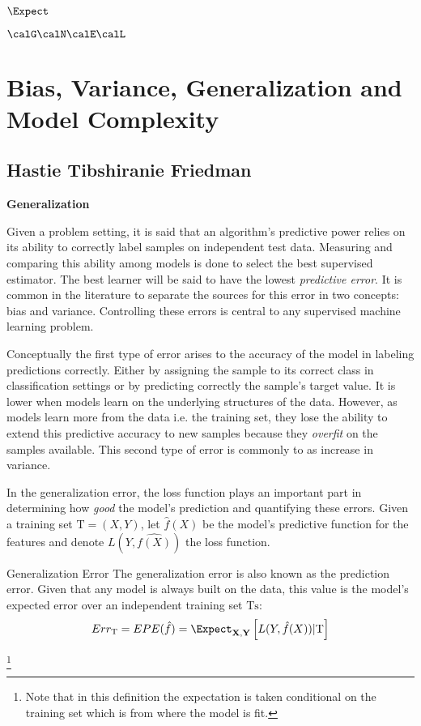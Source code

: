  
$\Expect$

$\calG \calN \calE \calL$

\section{Bias, Variance, Generalization and Model Complexity}


\subsection{Hastie Tibshiranie Friedman}

\textbf{Generalization}

Given a problem setting, it is said that an algorithm's predictive power relies on its ability to correctly label samples on independent test data. Measuring and comparing this ability among models is done to select the best supervised estimator.  The best learner will be said to have the lowest \textit{predictive error}. It is common in the literature \cite{james-biasVarianceGeneral} to separate the sources for this error in two concepts: bias and variance. Controlling these errors is central to any supervised machine learning problem.

Conceptually the first type of error arises to the accuracy of the model in labeling predictions correctly. Either by assigning the sample to its correct class in classification settings or by predicting correctly the sample's target value. It is lower when models learn on the underlying structures of the data. However, as models learn more from the data i.e. the training set, they lose the ability to extend this predictive accuracy to new samples because they \textit{overfit} on the samples available. This second type of error is commonly to as increase in variance.

In the generalization error, the loss function plays an important part in determining how \textit{good} the model's prediction and quantifying these errors. Given a training set $\mathrm{T} = (X,Y)$, let $\hat{f}(X)$ be the model's predictive function for the features and denote $L( Y,\hat{f(X)} )$ the loss function. 

\cite{james-biasVarianceGeneral}

\begin{definition}{Generalization Error}
	The generalization error is also known as the prediction error. Given that any model is always built on the data, this value is the model's expected error over an independent training set $\mathrm{Ts}$:
	$$ Err_{\mathrm{T}} =  EPE(\hat{f})= \Expect_{\textbf{X},\textbf{Y}} \left[ L(Y,\hat{f}(X)) |  \mathrm{T}\right]$$
\end{definition}\footnote{Note that in this definition the expectation is taken conditional on the training set which is from where the model is fit.}

